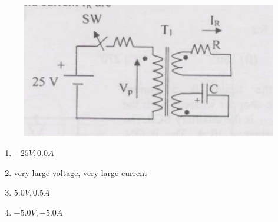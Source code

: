 \documentclass[journal,12pt,onecolumn]{IEEEtran}
\theoremstyle{remark}
\begin{document}
\begin{enumerate}
\begin{figure}[h]
	\centering
	\includegraphics[scale=0.5]{figs/fig 6.png}
	\label{Fig-6}
\end{figure}
\begin{enumerate}
\item $-25 V, 0.0 A$
\item very large voltage, very large current
\item $5.0 V, 0.5 A$
\item $-5.0 V, -5.0 A$
\end{enumerate}


\end{enumerate}
\end{document}
